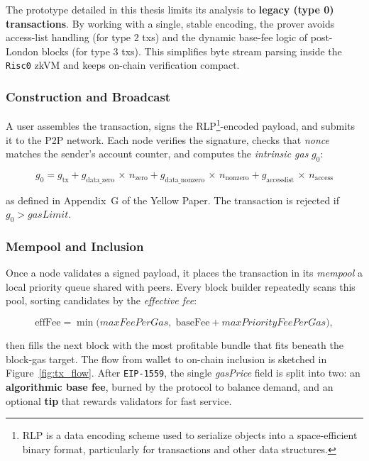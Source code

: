The prototype detailed in this thesis limits its analysis to \textbf{legacy (type 0) transactions}.  
By working with a single, stable encoding, the prover avoids access-list handling (for type 2 txs) and the dynamic base-fee logic of post-London blocks (for type 3 txs).  
This simplifies byte stream parsing inside the \texttt{Risc0} zkVM and keeps on-chain verification compact.



\subsubsection{Construction and Broadcast}  
A user assembles the transaction, signs the RLP\footnote{RLP is a data encoding scheme used to serialize objects into a space-efficient binary format, particularly for transactions and other data structures.}-encoded payload, and submits it to the P2P network. Each node verifies the signature, checks that \textit{nonce} matches the sender's account counter, and computes the \textit{intrinsic gas} $g_0$:

\[
g_0 =
g_\text{tx} +
g_\text{data\_zero}\,\times\,n_\text{zero} +
g_\text{data\_nonzero}\,\times\,n_\text{nonzero} +
g_\text{accesslist}\,\times\,n_\text{access}
\]

as defined in Appendix~G of the Yellow Paper.\cite{Wood2014}  
The transaction is rejected if $g_0 > \textit{gasLimit}$.

\subsubsection{Mempool and Inclusion}\label{sssec:mempool}
Once a node validates a signed payload, it places the transaction in its
\textit{mempool} a local priority queue shared with peers. Every block
builder repeatedly scans this pool, sorting candidates by the \textit{effective
fee}:

\[
\text{effFee}
= \min\!\bigl(\textit{maxFeePerGas},\;
              \text{baseFee} + \textit{maxPriorityFeePerGas}\bigr),
\]

then fills the next block with the most profitable bundle that fits beneath
the block‐gas target.  The flow from wallet to on-chain inclusion is sketched
in Figure~\ref{fig:tx_flow}.  After \texttt{EIP-1559}, the single
\textit{gasPrice} field is split into two: an \textbf{algorithmic base fee}, burned
by the protocol to balance demand, and an optional \textbf{tip} that rewards
validators for fast service.

